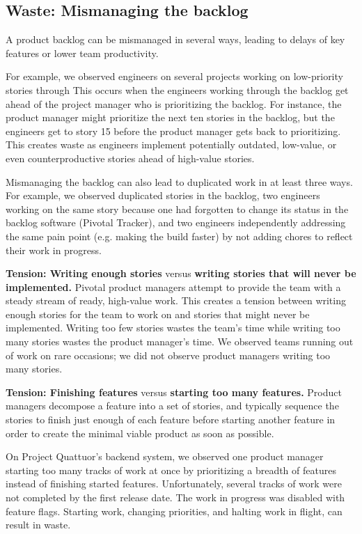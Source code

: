 \subsection{Waste: Mismanaging the backlog}
A product backlog can be mismanaged in several ways, leading to delays of key features or lower team productivity. 

For example, we observed engineers on several projects working on low-priority stories through  This occurs when the engineers working through the backlog get ahead of the project manager who is prioritizing the backlog. For instance, the product manager might prioritize the next ten stories in the backlog, but the engineers get to story 15 before the product manager gets back to prioritizing. This creates waste as engineers implement potentially outdated, low-value, or even counterproductive stories ahead of high-value stories.   

Mismanaging the backlog can also lead to duplicated work in at least three ways. For example, we observed duplicated stories in the backlog, two engineers working on the same story because one had forgotten to change its status in the backlog software (Pivotal Tracker), and two engineers independently addressing the same pain point (e.g. making the build faster) by not adding chores to reflect their work in progress.

\textbf{Tension: Writing enough stories} versus \textbf{writing stories that will never be implemented.}
Pivotal product managers attempt to provide the team with a steady stream of ready, high-value work. This creates a tension between writing enough stories for the team to work on and  stories that might never be implemented. Writing too few stories wastes the team's time while writing too many stories wastes the product manager's time. We observed teams running out of work on rare occasions; we did not observe product managers writing too many stories.  

\textbf{Tension: Finishing features} versus \textbf{starting too many features.}
Product managers decompose a feature into a set of stories, and typically sequence the stories to finish just enough of each feature before starting another feature in order to create the minimal viable product as soon as possible. 

On Project Quattuor's backend system, we observed one product manager starting too many tracks of work at once by prioritizing a breadth of features instead of finishing started features. Unfortunately, several tracks of work were not completed by the first release date. The work in progress was disabled with feature flags. Starting work, changing priorities, and halting work in flight, can result in waste.

